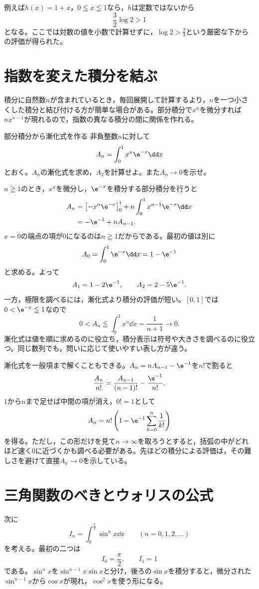 例えば$h(x)=1+x$，$0\leqq x\leqq1$なら，$h$は定数ではないから
\[
 \frac32\log2>1
\]
となる。ここでは対数の値を小数で計算せずに，$\log2>\frac23$という厳密な下からの評価が得られた。

\section{指数を変えた積分を結ぶ}\label{節:積分漸化式}

積分に自然数$n$が含まれているとき，毎回展開して計算するより，$n$を一つ小さくした積分と結び付ける方が簡単な場合がある。部分積分で$x^n$を微分すれば$n x^{n-1}$が現れるので，指数の異なる積分の間に関係を作れる。

\begin{example}{部分積分から漸化式を作る}
非負整数$n$に対して
\[
 A_n=\int_0^1 x^n\e^{-x}\dd x
\]
とおく。$A_n$の漸化式を求め，$A_2$を計算せよ。また$A_n\to0$を示せ。
\end{example}

$n\geqq1$のとき，$x^n$を微分し，$\e^{-x}$を積分する部分積分を行うと
\begin{align*}
 A_n
 &=\left[-x^n\e^{-x}\right]_0^1
   +n\int_0^1x^{n-1}\e^{-x}\dd x\\
 &=-\e^{-1}+nA_{n-1}.
\end{align*}
$x=0$の端点の項が$0$になるのは$n\geqq1$だからである。最初の値は別に
\[
 A_0=\int_0^1\e^{-x}\dd x=1-\e^{-1}
\]
と求める。よって
\[
 A_1=1-2\e^{-1},\qquad A_2=2-5\e^{-1}.
\]
一方，極限を調べるには，漸化式より積分の評価が短い。$[0,1]$では$0<\e^{-x}\leqq1$なので
\[
 0<A_n\leqq\int_0^1x^n\dd x=\frac1{n+1}\longrightarrow0.
\]
漸化式は値を順に求めるのに役立ち，積分表示は符号や大きさを調べるのに役立つ。同じ数列でも，問いに応じて使いやすい表し方が違う。

漸化式を一般項まで解くこともできる。$A_n=nA_{n-1}-\e^{-1}$を$n!$で割ると
\[
 \frac{A_n}{n!}=\frac{A_{n-1}}{(n-1)!}-\frac{\e^{-1}}{n!}.
\]
$1$から$n$まで足せば中間の項が消え，$0!=1$として
\[
 A_n=n!\left(1-\e^{-1}\sum_{k=0}^{n}\frac1{k!}\right)
\]
を得る。ただし，この形だけを見て$n\to\infty$を取ろうとすると，括弧の中がどれほど速く$0$に近づくかも調べる必要がある。先ほどの積分による評価は，その難しさを避けて直接$A_n\to0$を示している。

\section{三角関数のべきとウォリスの公式}\label{節:ウォリス公式}

次に
\[
 I_n=\int_0^{\frac{\pi}{2}}\sin^n x\dd x
 \qquad(n=0,1,2,\ldots)
\]
を考える。最初の二つは
\[
 I_0=\frac{\pi}{2},\qquad I_1=1
\]
である。$\sin^n x$を$\sin^{n-1}x\sin x$と分け，後ろの$\sin x$を積分すると，微分された$\sin^{n-1}x$から$\cos x$が現れ，$\cos^2x$を使う形になる。

